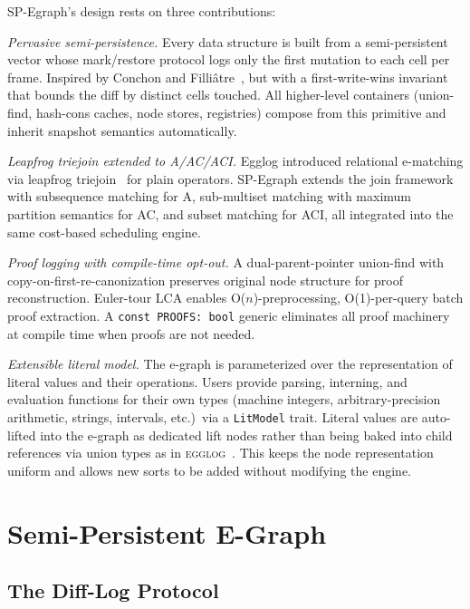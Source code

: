 \documentclass[sigplan,nonacm]{acmart}
\begin{document}
\medskip

SP-Egraph's design rests on three contributions:

\emph{Pervasive semi-persistence.}  Every data structure is built
from a semi-persistent vector whose mark/restore
protocol logs only the first mutation to each cell per frame.
Inspired by Conchon and Filli\^{a}tre~\cite{conchon-filliatre}, but
with a first-write-wins invariant that bounds the diff by distinct
cells touched.  All higher-level containers (union-find, hash-cons
caches, node stores, registries) compose from this primitive and
inherit snapshot semantics automatically.

\emph{Leapfrog triejoin extended to A/AC/ACI.}  Egglog introduced
relational e-matching via leapfrog triejoin~\cite{veldhuizen} for
plain operators.  SP-Egraph extends the join framework with
subsequence matching for A, sub-multiset matching with maximum
partition semantics for AC, and subset matching for ACI, all
integrated into the same cost-based scheduling engine.

\emph{Proof logging with compile-time opt-out.}  A dual-parent-pointer
union-find with copy-on-first-re-canonization preserves original node
structure for proof reconstruction.  Euler-tour LCA enables
O($n$)-preprocessing, O(1)-per-query batch proof extraction.  A \texttt{const PROOFS: bool} generic
eliminates all proof machinery at compile time when proofs are not
needed.

\emph{Extensible literal model.}  The e-graph is parameterized over
the representation of literal values and their operations.  Users
provide parsing, interning, and evaluation functions for their own
types (machine integers, arbitrary-precision arithmetic, strings,
intervals, etc.)\ via a \texttt{LitModel} trait.  Literal values are
auto-lifted into the e-graph as dedicated lift nodes rather than
being baked into child references via union types as in
\textsc{egglog}~\cite{egglog}.  This keeps the node representation
uniform and allows new sorts to be added without modifying the
engine.

\section{Semi-Persistent E-Graph}

\subsection{The Diff-Log Protocol}
\end{document}

